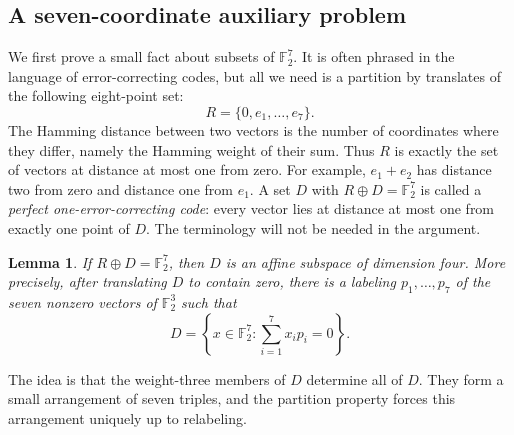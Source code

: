 \documentclass[11pt]{article}
\numberwithin{equation}{section}
\newtheorem{lemma}[theorem]{Lemma}
\theoremstyle{definition}
\theoremstyle{remark}\newtheorem{remark}[theorem]{Remark}
\begin{document}
\subsection{A seven-coordinate auxiliary problem}

We first prove a small fact about subsets of $\mathbb F_2^7$.  It is often
phrased in the language of error-correcting codes, but all we need is a
partition by translates of the following eight-point set:
\[
 R=\{0,e_1,\ldots,e_7\}.
\]
The Hamming distance between two vectors is the number of coordinates
where they differ, namely the Hamming weight of their sum.  Thus $R$ is
exactly the set of vectors at distance at most one from zero.  For example,
$e_1+e_2$ has distance two from zero and distance one from $e_1$.
A set $D$ with $R\oplus D=\mathbb F_2^7$ is called a
\emph{perfect one-error-correcting code}: every vector lies at distance
at most one from exactly one point of $D$.  The terminology will not be
needed in the argument.

\begin{lemma}\label{lem:perfect-seven-elementary}
If $R\oplus D=\mathbb F_2^7$, then $D$ is an affine subspace of dimension
four.  More precisely, after translating $D$ to contain zero, there is a
labeling $p_1,\ldots,p_7$ of the seven nonzero vectors of $\mathbb F_2^3$
such that
\[
 D=\left\{x\in\mathbb F_2^7:\sum_{i=1}^7 x_i p_i=0\right\}.
\]
\end{lemma}

The idea is that the weight-three members of $D$ determine all of $D$.
They form a small arrangement of seven triples, and the partition property
forces this arrangement uniquely up to relabeling.
\end{document}
